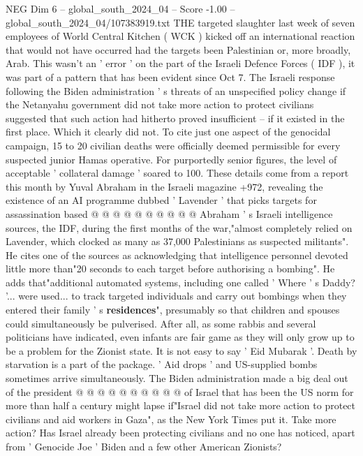 \begin{textsample}{NEG Dim 6 – global\_south\_2024\_04 – Score -1.00 – global\_south\_2024\_04/107383919.txt}  \label{ex:f6_neg_328}
THE targeted slaughter last week of seven employees of World Central Kitchen ( WCK ) kicked off an international reaction that would not have occurred had the targets been Palestinian or, more broadly, Arab.
This wasn't an ' error ' on the part of the Israeli Defence Forces ( IDF ), it was part of a pattern that has been evident since Oct 7.
The Israeli response following the Biden administration ' s threats of an unspecified policy change if the Netanyahu government did not take more action to protect civilians suggested that such action had hitherto proved insufficient -- if it existed in the first place.
Which it clearly did not.
To cite just one aspect of the genocidal campaign, 15 to 20 civilian deaths were officially deemed permissible for every suspected junior Hamas operative.
For purportedly senior figures, the level of acceptable ' collateral damage ' soared to 100.
These details come from a report this month by Yuval Abraham in the Israeli magazine +972, revealing the existence of an AI programme dubbed ' Lavender ' that picks targets for assassination based @ @ @ @ @ @ @ @ @ @ Abraham ' s Israeli intelligence sources, the IDF, during the first months of the war,"almost completely relied on Lavender, which clocked as many as 37,000 Palestinians as suspected militants".
He cites one of the sources as acknowledging that intelligence personnel devoted little more than"20 seconds to each target before authorising a bombing".
He adds that"additional automated systems, including one called ' Where ' s Daddy? '... were used... to track targeted individuals and carry out bombings when they entered their family ' s \textbf{residences}", presumably so that children and spouses could simultaneously be pulverised.
After all, as some rabbis and several politicians have indicated, even infants are fair game as they will only grow up to be a problem for the Zionist state.
It is not easy to say ' Eid Mubarak '.
Death by starvation is a part of the package. ' Aid drops ' and US-supplied bombs sometimes arrive simultaneously.
The Biden administration made a big deal out of the president @ @ @ @ @ @ @ @ @ @ of Israel that has been the US norm for more than half a century might lapse if"Israel did not take more action to protect civilians and aid workers in Gaza", as the New York Times put it.
Take more action?
Has Israel already been protecting civilians and no one has noticed, apart from ' Genocide Joe ' Biden and a few other American Zionists?

\end{textsample}
